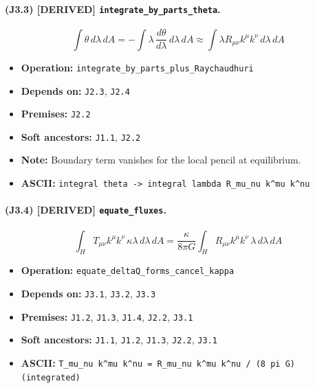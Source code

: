 \documentclass[11pt,a4paper]{article}
\theoremstyle{remark}\newtheorem*{caution}{Caution}
\newcommand{\tagbox}[1]{\textsc{[#1]}}
\begin{document}
\paragraph{(J3.3) \tagbox{DERIVED} \texttt{integrate\_by\_parts\_theta}.}
\begin{equation}
\int\theta\,d\lambda\,dA=-\int\lambda\,\frac{d\theta}{d\lambda}\,d\lambda\,dA\approx\int\lambda R_{\mu\nu}k^\mu k^\nu\,d\lambda\,dA
\tag{J3.3}
\end{equation}
\begin{itemize}\setlength{\itemsep}{0.12em}
\item \textbf{Operation:} \texttt{integrate\_by\_parts\_plus\_Raychaudhuri}
\item \textbf{Depends on:} \texttt{J2.3}, \texttt{J2.4}
\item \textbf{Premises:} \texttt{J2.2}
\item \textbf{Soft ancestors:} \texttt{J1.1}, \texttt{J2.2}
\item \textbf{Note:} Boundary term vanishes for the local pencil at equilibrium.
\item \textbf{ASCII:} \texttt{integral theta -> integral lambda R\_mu\_nu k^mu k^nu}
\end{itemize}
\paragraph{(J3.4) \tagbox{DERIVED} \texttt{equate\_fluxes}.}
\begin{equation}
\int_H T_{\mu\nu}k^\mu k^\nu\,\kappa\lambda\,d\lambda\,dA=\frac{\kappa}{8\pi G}\int_H R_{\mu\nu}k^\mu k^\nu\,\lambda\,d\lambda\,dA
\tag{J3.4}
\end{equation}
\begin{itemize}\setlength{\itemsep}{0.12em}
\item \textbf{Operation:} \texttt{equate\_deltaQ\_forms\_cancel\_kappa}
\item \textbf{Depends on:} \texttt{J3.1}, \texttt{J3.2}, \texttt{J3.3}
\item \textbf{Premises:} \texttt{J1.2}, \texttt{J1.3}, \texttt{J1.4}, \texttt{J2.2}, \texttt{J3.1}
\item \textbf{Soft ancestors:} \texttt{J1.1}, \texttt{J1.2}, \texttt{J1.3}, \texttt{J2.2}, \texttt{J3.1}
\item \textbf{ASCII:} \texttt{T\_mu\_nu k^mu k^nu = R\_mu\_nu k^mu k^nu / (8 pi G)  (integrated)}
\end{itemize}
\end{document}
